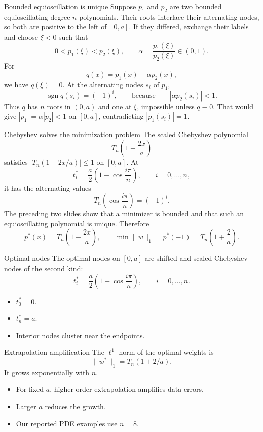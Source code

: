 \documentclass[aspectratio=169,11pt]{beamer}
\begin{document}
\begin{frame}{Bounded equioscillation is unique}
\small
Suppose $p_1$ and $p_2$ are two bounded equioscillating degree-$n$ polynomials.
Their roots interlace their alternating nodes, so both are positive to the left of $[0,a]$.
If they differed, exchange their labels and choose $\xi<0$ such that
\[
  0<p_1(\xi)<p_2(\xi),
  \qquad
  \alpha=\frac{p_1(\xi)}{p_2(\xi)}\in(0,1).
\]
For
\[
  q(x)=p_1(x)-\alpha p_2(x),
\]
we have $q(\xi)=0$. At the alternating nodes $s_i$ of $p_1$,
\[
  \operatorname{sgn}q(s_i)=(-1)^i,
  \qquad\text{because}\qquad |\alpha p_2(s_i)|<1.
\]
Thus $q$ has $n$ roots in $(0,a)$ and one at $\xi$, impossible unless $q\equiv0$.
That would give $|p_1|=\alpha|p_2|<1$ on $[0,a]$, contradicting $|p_1(s_i)|=1$.
\end{frame}

\begin{frame}{Chebyshev solves the minimization problem}
\small
The scaled Chebyshev polynomial
\[
  T_n\!\left(1-\frac{2x}{a}\right)
\]
satisfies $\left|T_n(1-2x/a)\right|\le1$ on $[0,a]$. At
\[
  t_i^\ast=
  \frac{a}{2}\left(1-\cos\frac{i\pi}{n}\right),
  \qquad i=0,\ldots,n,
\]
it has the alternating values
\[
  T_n\!\left(\cos\frac{i\pi}{n}\right)
  =
  (-1)^i.
\]
The preceding two slides show that a minimizer is bounded and that such an
equioscillating polynomial is unique. Therefore
\[
  \boxed{p^\ast(x)=T_n\!\left(1-\frac{2x}{a}\right),\qquad
  \min\|w\|_1=p^\ast(-1)=T_n\!\left(1+\frac{2}{a}\right).}
\]
\end{frame}

\begin{frame}{Optimal nodes}
\small
The optimal nodes on $[0,a]$ are shifted and scaled Chebyshev nodes of the second kind:
\[
  t_i^\ast=
  \frac{a}{2}
  \left(1-\cos\frac{i\pi}{n}\right),
  \qquad i=0,\ldots,n.
\]

\begin{itemize}
  \item $t_0^\ast=0$.
  \item $t_n^\ast=a$.
  \item Interior nodes cluster near the endpoints.
\end{itemize}
\end{frame}

\begin{frame}{Extrapolation amplification}
\small
The $\ell^1$ norm of the optimal weights is
\[
  \|w^\ast\|_1=T_n(1+2/a).
\]
It grows exponentially with $n$.

\begin{itemize}
  \item For fixed $a$, higher-order extrapolation amplifies data errors.
  \item Larger $a$ reduces the growth.
  \item Our reported PDE examples use $n=8$.
\end{itemize}
\end{frame}
\end{document}
